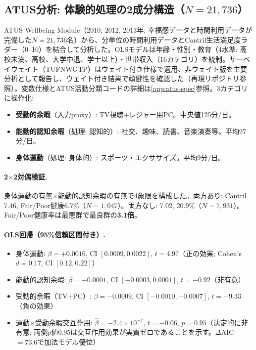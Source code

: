 \documentclass[a4paper,11pt,titlepage]{article}
\begin{document}
\subsection{\texorpdfstring{ATUS分析: 体験的処理の2成分構造（$N=21{,}736$）}{ATUS分析: 体験的処理の2成分構造（N=21,736）}}\label{sec:atus}

ATUS Wellbeing Module（2010, 2012, 2013年; 幸福感データと時間利用データが完備した$N = 21{,}736$名）から、分単位の時間利用データとCantril生活満足度ラダー（0--10）を結合して分析した。OLSモデルは年齢・性別・教育（4水準: 高校未満、高校、大学中退、学士以上）・世帯収入（16カテゴリ）を統制。サーベイウェイト（TUFNWGTP）はウェイト付き仕様で適用、非ウェイト版を主要分析として報告し、ウェイト付き結果で頑健性を確認した（再現リポジトリ参照）。変数仕様とATUS活動分類コードの詳細は\cref{app:atus-spec}参照。3カテゴリに操作化:
\begin{itemize}
  \item \textbf{受動的余暇}（入力proxy）: TV視聴$+$レジャー用PC。中央値125分/日。
  \item \textbf{能動的認知余暇}（処理: 認知的）: 社交、趣味、読書、音楽演奏等。平均97分/日。
  \item \textbf{身体運動}（処理: 身体的）: スポーツ・エクササイズ。平均9分/日。
\end{itemize}

\paragraph{2$\times$2対偶検証.}
身体運動の有無$\times$能動的認知余暇の有無で4象限を構成した。両方あり: Cantril 7.46, Fair/Poor健康6.7\%（$N=1{,}047$）。両方なし: 7.02, 20.9\%（$N=7{,}931$）。Fair/Poor健康率は最悪群で最良群の\textbf{3.1倍}。

\paragraph{OLS回帰（95\%信頼区間付き）.}
\begin{itemize}
  \item 身体運動: $\beta = +0.0016$, CI $[0.0009, 0.0022]$, $t = 4.97$（正の効果; Cohen's $d = 0.17$, CI $[0.12, 0.22]$）
  \item 能動的認知余暇: $\beta = -0.0001$, CI $[-0.0003, 0.0001]$, $t = -0.92$（非有意）
  \item 受動的余暇（TV+PC）: $\beta = -0.0009$, CI $[-0.0010, -0.0007]$, $t = -9.33$（負の効果）
  \item 運動$\times$受動余暇交互作用: $\hat{\beta} = -2.4 \times 10^{-7}$, $t = -0.06$, $p = 0.95$（決定的に非有意; 両側$p$値0.95は交互作用効果が実質ゼロであることを示す。$\Delta$AIC $= 73.6$で加法モデル優位）
\end{itemize}
\end{document}
